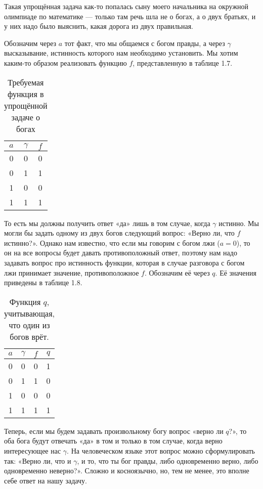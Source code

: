 Такая упрощённая задача как-то попалась сыну моего начальника на окружной олимпиаде по математике — только там речь шла не о богах, а о двух братьях, и у них надо было выяснить, какая дорога из двух правильная.

Обозначим через $a$ тот факт, что мы общаемся с богом правды, а через $\gamma$ высказывание, истинность которого нам необходимо установить. Мы хотим каким-то образом реализовать функцию $f$, представленную в таблице 1.7.

\begin{table}[h]
\centering
\begin{tabular}{cc|c}
$a$ & $\gamma$ & $f$ \\
\hline
 0  &     0    &  0  \\
 0  &     1    &  1  \\
 1  &     0    &  0  \\
 1  &     1    &  1
\end{tabular}
\caption{Требуемая функция в упрощённой задаче о богах}
\end{table}

То есть мы должны получить ответ «да» лишь в том случае, когда $\gamma$ истинно. Мы могли бы задать одному из двух богов следующий вопрос: «Верно ли, что $f$ истинно?». Однако нам известно, что если мы говорим с богом лжи ($a = 0$), то он на все вопросы будет давать противоположный ответ, поэтому нам \mbox{надо} задавать вопрос про истинность функции, которая в случае разговора с богом лжи принимает значение, противоположное $f$. Обозначим её через $q$. Её значения приведены в таблице 1.8.

\begin{table}[h]
\centering
\begin{tabular}{cc|cc}
$a$ & $\gamma$ & $f$ & $q$ \\
\hline
 0  &     0    &  0  &  1  \\
 0  &     1    &  1  &  0  \\
 1  &     0    &  0  &  0  \\
 1  &     1    &  1  &  1
\end{tabular}
\caption{Функция $q$, учитывающая, что один из богов врёт.}
\end{table}

Теперь, если мы будем задавать произвольному богу вопрос «верно ли $q$?», то оба бога будут отвечать «да» в том и только в том случае, когда верно интересующее нас $\gamma$. На человеческом языке этот вопрос можно сформулировать так: «Верно ли, что и $\gamma$, и то, что ты бог правды, либо одновременно верно, либо одновременно неверно?». Сложно и косноязычно, но, тем не менее, это вполне себе ответ на нашу задачу.

